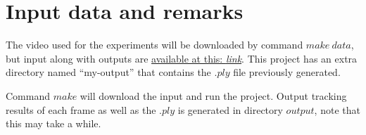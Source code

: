 \section{Input data and remarks}
The video used for the experiments will be downloaded by command $make~data$, but input along with outputs are \href{https://drive.google.com/open?id=0B1h46SOyOOVAdXRPX2l1VlBBSDg}{available at this: \textit{link}}. This project has an extra directory named “my-output” that contains the $.ply$ file previously generated.

Command $make$ will download the input and run the project. Output tracking results of each frame as well as the $.ply$ is generated in directory $output$, note that this may take a while.

